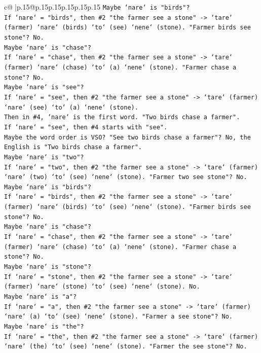 \documentclass{article}
\begin{document}
{\begin{supertabular}{c@{$\;$}|p{.15\linewidth}@{}p{.15\linewidth}p{.15\linewidth}p{.15\linewidth}p{.15\linewidth}p{.15\linewidth}}
{{{\texttt{Maybe `nare` is "birds"?} \\
\texttt{If `nare` = "birds", then \#2 "the farmer see a stone" {-}> `tare` (farmer) `nare` (birds) `to` (see) `nene` (stone). "Farmer birds see stone"? No.} \\
\texttt{Maybe `nare` is "chase"?} \\
\texttt{If `nare` = "chase", then \#2 "the farmer see a stone" {-}> `tare` (farmer) `nare` (chase) `to` (a) `nene` (stone). "Farmer chase a stone"? No.} \\
\texttt{Maybe `nare` is "see"?} \\
\texttt{If `nare` = "see", then \#2 "the farmer see a stone" {-}> `tare` (farmer) `nare` (see) `to` (a) `nene` (stone).} \\
\texttt{Then in \#4, `nare` is the first word. "Two birds chase a farmer".} \\
\texttt{If `nare` = "see", then \#4 starts with "see".} \\
\texttt{Maybe the word order is VSO? "See two birds chase a farmer"? No, the English is "Two birds chase a farmer".} \\
\texttt{Maybe `nare` is "two"?} \\
\texttt{If `nare` = "two", then \#2 "the farmer see a stone" {-}> `tare` (farmer) `nare` (two) `to` (see) `nene` (stone). "Farmer two see stone"? No.} \\
\texttt{Maybe `nare` is "birds"?} \\
\texttt{If `nare` = "birds", then \#2 "the farmer see a stone" {-}> `tare` (farmer) `nare` (birds) `to` (see) `nene` (stone). "Farmer birds see stone"? No.} \\
\texttt{Maybe `nare` is "chase"?} \\
\texttt{If `nare` = "chase", then \#2 "the farmer see a stone" {-}> `tare` (farmer) `nare` (chase) `to` (a) `nene` (stone). "Farmer chase a stone"? No.} \\
\texttt{Maybe `nare` is "stone"?} \\
\texttt{If `nare` = "stone", then \#2 "the farmer see a stone" {-}> `tare` (farmer) `nare` (stone) `to` (see) `nene` (stone). No.} \\
\texttt{Maybe `nare` is "a"?} \\
\texttt{If `nare` = "a", then \#2 "the farmer see a stone" {-}> `tare` (farmer) `nare` (a) `to` (see) `nene` (stone). "Farmer a see stone"? No.} \\
\texttt{Maybe `nare` is "the"?} \\
\texttt{If `nare` = "the", then \#2 "the farmer see a stone" {-}> `tare` (farmer) `nare` (the) `to` (see) `nene` (stone). "Farmer the see stone"? No.} \\
}}}
\end{supertabular}}
\end{document}

